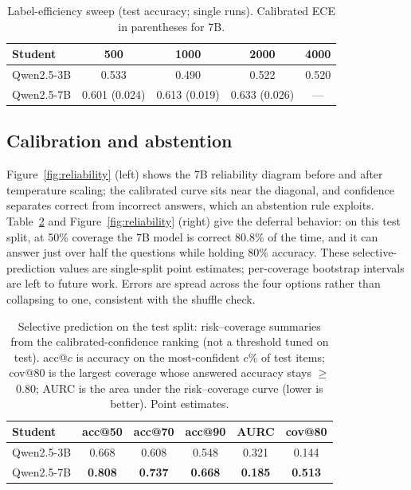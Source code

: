 \documentclass[conference]{IEEEtran}
\begin{document}
\begin{table}[tb]
\caption{Label-efficiency sweep (test accuracy; single runs). Calibrated ECE in parentheses for 7B.}
\label{tab:eff}
\centering
\small
\begin{tabular}{@{}lcccc@{}}
\toprule
Student & 500 & 1000 & 2000 & 4000 \\
\midrule
Qwen2.5-3B & 0.533 & 0.490 & 0.522 & 0.520 \\
Qwen2.5-7B & 0.601 (0.024) & 0.613 (0.019) & 0.633 (0.026) & --- \\
\bottomrule
\end{tabular}
\end{table}

\subsection{Calibration and abstention}
Figure~\ref{fig:reliability} (left) shows the 7B reliability diagram before and after temperature scaling; the calibrated curve sits near the diagonal, and confidence separates correct from incorrect answers, which an abstention rule exploits. Table~\ref{tab:abstain} and Figure~\ref{fig:reliability} (right) give the deferral behavior: on this test split, at 50\% coverage the 7B model is correct 80.8\% of the time, and it can answer just over half the questions while holding 80\% accuracy. These selective-prediction values are single-split point estimates; per-coverage bootstrap intervals are left to future work. Errors are spread across the four options rather than collapsing to one, consistent with the shuffle check.

\begin{table}[tb]
\caption{Selective prediction on the test split: risk--coverage summaries from the calibrated-confidence ranking (not a threshold tuned on test). acc@$c$ is accuracy on the most-confident $c\%$ of test items; cov@80 is the largest coverage whose answered accuracy stays $\ge$0.80; AURC is the area under the risk--coverage curve (lower is better). Point estimates.}
\label{tab:abstain}
\centering
\small
\setlength{\tabcolsep}{4pt}
\begin{tabular}{@{}lccccc@{}}
\toprule
Student & acc@50 & acc@70 & acc@90 & AURC & cov@80 \\
\midrule
Qwen2.5-3B & 0.668 & 0.608 & 0.548 & 0.321 & 0.144 \\
Qwen2.5-7B & \textbf{0.808} & \textbf{0.737} & \textbf{0.668} & \textbf{0.185} & \textbf{0.513} \\
\bottomrule
\end{tabular}
\end{table}
\end{document}
